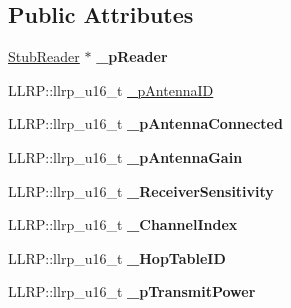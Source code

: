 \subsection*{Public Attributes}
\begin{DoxyCompactItemize}
\item 
\hypertarget{class_e_l_f_i_n_1_1_stub_antenna_a5b447fe2863538a0ccc5e09d53342a5c}{\hyperlink{class_e_l_f_i_n_1_1_stub_reader}{Stub\-Reader} $\ast$ {\bfseries \-\_\-p\-Reader}}\label{class_e_l_f_i_n_1_1_stub_antenna_a5b447fe2863538a0ccc5e09d53342a5c}

\item 
L\-L\-R\-P\-::llrp\-\_\-u16\-\_\-t \hyperlink{class_e_l_f_i_n_1_1_stub_antenna_a83bcedc25647781fa894c00c204b821e}{\-\_\-p\-Antenna\-I\-D}
\item 
\hypertarget{class_e_l_f_i_n_1_1_stub_antenna_aa6a2df74abfdd93700b0420e2c7c41a4}{L\-L\-R\-P\-::llrp\-\_\-u16\-\_\-t {\bfseries \-\_\-p\-Antenna\-Connected}}\label{class_e_l_f_i_n_1_1_stub_antenna_aa6a2df74abfdd93700b0420e2c7c41a4}

\item 
\hypertarget{class_e_l_f_i_n_1_1_stub_antenna_a8a49cb67003c7e75ea435d0789019258}{L\-L\-R\-P\-::llrp\-\_\-u16\-\_\-t {\bfseries \-\_\-p\-Antenna\-Gain}}\label{class_e_l_f_i_n_1_1_stub_antenna_a8a49cb67003c7e75ea435d0789019258}

\item 
\hypertarget{class_e_l_f_i_n_1_1_stub_antenna_a0bb11474fd1f934e450fe74b22854113}{L\-L\-R\-P\-::llrp\-\_\-u16\-\_\-t {\bfseries \-\_\-\-Receiver\-Sensitivity}}\label{class_e_l_f_i_n_1_1_stub_antenna_a0bb11474fd1f934e450fe74b22854113}

\item 
\hypertarget{class_e_l_f_i_n_1_1_stub_antenna_acb003301c5678e8f9a11643e6589d44b}{L\-L\-R\-P\-::llrp\-\_\-u16\-\_\-t {\bfseries \-\_\-\-Channel\-Index}}\label{class_e_l_f_i_n_1_1_stub_antenna_acb003301c5678e8f9a11643e6589d44b}

\item 
\hypertarget{class_e_l_f_i_n_1_1_stub_antenna_ad314b5dd888fedacc91e7118a943cebd}{L\-L\-R\-P\-::llrp\-\_\-u16\-\_\-t {\bfseries \-\_\-\-Hop\-Table\-I\-D}}\label{class_e_l_f_i_n_1_1_stub_antenna_ad314b5dd888fedacc91e7118a943cebd}

\item 
\hypertarget{class_e_l_f_i_n_1_1_stub_antenna_a6b226cda31c6098087d84934a986aae6}{L\-L\-R\-P\-::llrp\-\_\-u16\-\_\-t {\bfseries \-\_\-p\-Transmit\-Power}}\label{class_e_l_f_i_n_1_1_stub_antenna_a6b226cda31c6098087d84934a986aae6}

\end{DoxyCompactItemize}
